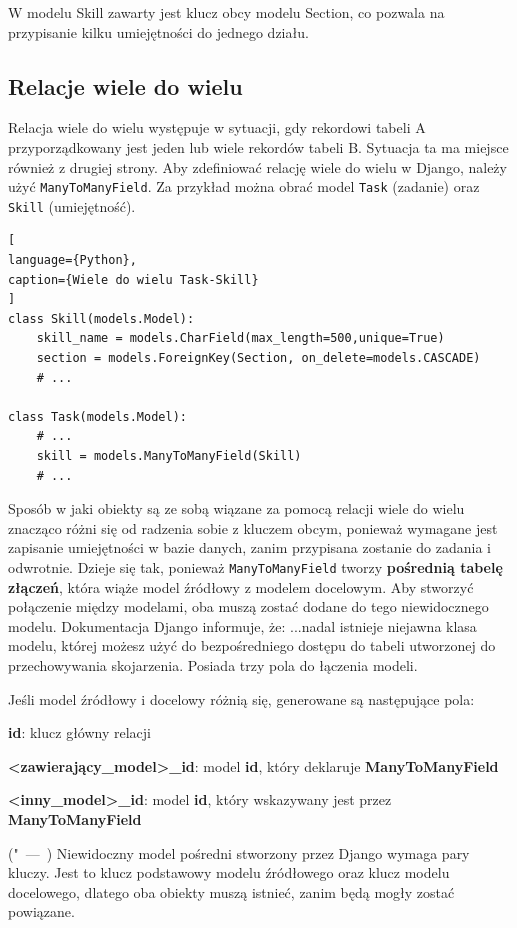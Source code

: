 \documentclass[oneside,polski,logo,indent]{amuthesis}
\let\oldquote\quote
\let\endoldquote\endquote
\renewenvironment{quote}[2][]
  {\if\relax\detokenize{#1}\relax
     \def\quoteauthor{#2}%
   \else
     \def\quoteauthor{#2~---~#1}%
   \fi
   \oldquote}
  {\par\nobreak\smallskip\hfill(\quoteauthor)%
   \endoldquote\addvspace{\bigskipamount}}
\begin{document}
W modelu Skill zawarty jest klucz obcy modelu Section, co pozwala na przypisanie kilku umiejętności do jednego działu.

\begin{center}
\subsection{Relacje wiele do wielu}
\end{center}
Relacja wiele do wielu występuje w sytuacji, gdy rekordowi tabeli A przyporządkowany jest jeden lub wiele rekordów tabeli B. Sytuacja ta ma miejsce również z drugiej strony.
Aby zdefiniować relację wiele do wielu w Django, należy użyć \texttt{ManyToManyField}. Za przykład można obrać model \texttt{Task} (zadanie) oraz \texttt{Skill} (umiejętność).
\begin{lstlisting}[
language={Python},
caption={Wiele do wielu Task-Skill}
]
class Skill(models.Model):
    skill_name = models.CharField(max_length=500,unique=True)
    section = models.ForeignKey(Section, on_delete=models.CASCADE)
	# ...

class Task(models.Model):
	# ...
    skill = models.ManyToManyField(Skill)
	# ...
\end{lstlisting}

Sposób w jaki obiekty są ze sobą wiązane za pomocą relacji wiele do wielu znacząco różni się od radzenia sobie z kluczem obcym, ponieważ wymagane jest zapisanie umiejętności w bazie danych, zanim przypisana zostanie do zadania i odwrotnie. Dzieje się tak, ponieważ \texttt{ManyToManyField} tworzy \textbf{pośrednią tabelę złączeń}, która wiąże model źródłowy z modelem docelowym. Aby stworzyć połączenie między modelami, oba muszą zostać dodane do tego niewidocznego modelu. Dokumentacja Django informuje, że:
\begin{quote}
"...nadal istnieje niejawna klasa modelu, której możesz użyć do bezpośredniego dostępu do tabeli utworzonej do przechowywania skojarzenia. Posiada trzy pola do łączenia modeli.

Jeśli model źródłowy i docelowy różnią się, generowane są następujące pola:

\textbf{id}: klucz główny relacji

\textbf{<zawierający\_model>\_id}: model \textbf{id}, który deklaruje \textbf{ManyToManyField}

\textbf{<inny\_model>\_id}: model \textbf{id}, który wskazywany jest przez \textbf{ManyToManyField}
\end{quote}
Niewidoczny model pośredni stworzony przez Django wymaga pary kluczy. Jest to klucz podstawowy modelu źródłowego oraz klucz modelu docelowego, dlatego oba obiekty muszą istnieć, zanim będą mogły zostać powiązane.
\end{document}
